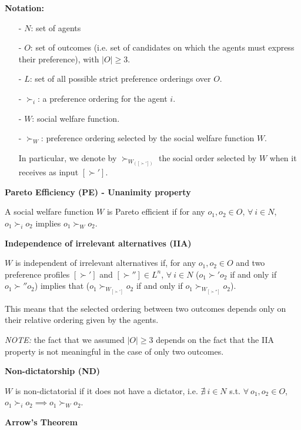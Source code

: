 \documentclass[pt11,a4paper,twoside,reqno,openright]{paper}
\begin{document}

\bigskip
\noindent \textbf{Notation:}
\begin{itemize}
	\item [-] $N$: set of agents
	\item [-] $O$: set of outcomes (i.e. set of candidates on which the agents 
	must express their preference), with $|O| \geq 3$.
	\item [-] $L$: set of all possible strict preference orderings over $O$.
	\item [-] $\succ_i$: a preference ordering for the agent $i$.
	\item [-] $W$: social welfare function.
	\item [-] $\succ_W$: preference ordering selected by the social welfare 
	function $W$.

	\noindent In particular, we denote by $\succ_{W_{([\succ'])}}$ the social 
	order selected by $W$ when it receives as input $[\succ']$.
\end{itemize}

\bigskip
\noindent \textbf{Pareto Efficiency (PE) - Unanimity property}

\noindent A social welfare function $W$ is Pareto efficient if for any $o_1, o_2 
\in O$, $\forall~i \in N$, $o_1 \succ_i o_2$ implies $o_1 \succ_W o_2$.

\bigskip
\noindent \textbf{Independence of irrelevant alternatives (IIA)}

\noindent $W$ is independent of irrelevant alternatives if, for any $o_1,o_2 
\in O$ and two preference profiles $[\succ']$ and $[\succ''] \in L^n$, 
$\forall~i \in N$ ($o_1 \succ' o_2$ if and only if $o_1 \succ'' o_2$) implies 
that ($o_1 \succ_{W_{[\succ']}} o_2$ if and only if $o_1 \succ_{W_{[\succ'']}} 
o_2$).

\noindent This means that the selected ordering between two outcomes depends 
only on their relative ordering given by the agents.

\noindent \textit{NOTE:} the fact that we assumed $|O| \geq 3$ depends on the 
fact that the IIA property is not meaningful in the case of only two outcomes.

\bigskip
\noindent \textbf{Non-dictatorship (ND)}

\noindent $W$ is non-dictatorial if it does not have a dictator, i.e. 
$\nexists ~i \in N$ s.t. $\forall ~o_1,o_2 \in O$, $o_1 \succ_i o_2 \implies 
o_1 \succ_W o_2$.

\bigskip
\noindent \textbf{Arrow's Theorem}
\end{document}
